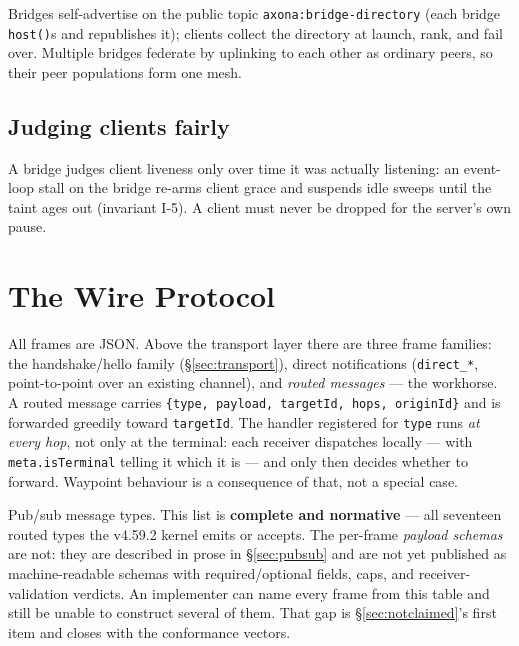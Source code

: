 \documentclass[nobib]{tufte-handout}
\begin{document}
Bridges self-advertise on the public topic
\texttt{axona:bridge-directory} (each bridge \texttt{host()}s and
republishes it); clients collect the directory at launch, rank, and fail
over. Multiple bridges federate by uplinking to each other as ordinary
peers, so their peer populations form one mesh.

\subsection{Judging clients fairly}

A bridge judges client liveness only over time it was actually
listening: an event-loop stall on the bridge re-arms client grace and
suspends idle sweeps until the taint ages out (invariant I-5). A client
must never be dropped for the server's own pause.

\section{The Wire Protocol}\label{sec:wire}

All frames are JSON. Above the transport layer there are three frame
families: the handshake/hello family (\S\ref{sec:transport}), direct
notifications (\texttt{direct\_*}, point-to-point over an existing
channel), and \emph{routed messages} --- the workhorse. A routed message
carries \texttt{\{type, payload, targetId, hops, originId\}} and is
forwarded greedily toward \texttt{targetId}. The handler registered for
\texttt{type} runs \emph{at every hop}, not only at the terminal: each
receiver dispatches locally --- with \texttt{meta.isTerminal} telling it
which it is --- and only then decides whether to forward. Waypoint
behaviour is a consequence of that, not a special case.

Pub/sub message types. This list is \textbf{complete and normative} ---
all seventeen routed types the v4.59.2 kernel emits or accepts. The
per-frame \emph{payload schemas} are not: they are described in prose in
\S\ref{sec:pubsub} and are not yet published as machine-readable
schemas with required/optional fields, caps, and receiver-validation
verdicts. An implementer can name every frame from this table and still
be unable to construct several of them. That gap is
\S\ref{sec:notclaimed}'s first item and closes with the conformance
vectors.
\end{document}
